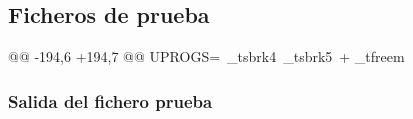 \subsection{Ficheros de prueba}
\begin{listing}
@@ -194,6 +194,7 @@ UPROGS=\
    _tsbrk4\
    _tsbrk5\
+   _tfreem\
\end{listing}

\subsubsection{Salida del fichero prueba}
